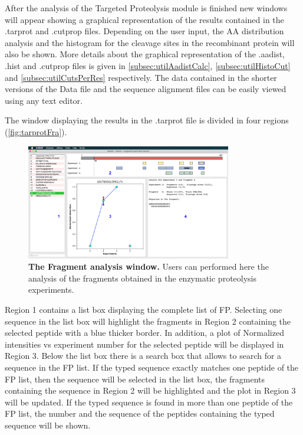 After the analysis of the Targeted Proteolysis module is finished new windows will appear showing a graphical representation of the results contained in the .tarprot and .cutprop files. Depending on the user input, the AA distribution analysis and the histogram for the cleavage sites in the recombinant protein will also be shown. More details about the graphical representation of the .aadist, .hist and .cutprop files is given in \autoref{subsec:utilAadistCalc}, \autoref{subsec:utilHistoCut} and \autoref{subsec:utilCutsPerRes} respectively. The data contained in the shorter versions of the Data file and the sequence alignment files can be easily viewed using any text editor.   

The window displaying the results in the .tarprot file is divided in four regions (\autoref{fig:tarprotFra}).

\begin{figure}[h]
    \centering
    \includegraphics[width=0.8\textwidth]{./IMAGES/MOD-TARPROT/tarprot-frag.jpg}	    
    \caption[The Fragment analysis window]{\textbf{The Fragment analysis window.} Users can performed here the analysis of the fragments obtained in the enzymatic proteolysis experiments.} 
    \label{fig:tarprotFra}
    \vspace{-5pt} 	
\end{figure} 

Region \num{1} contains a list box displaying the complete list of FP. Selecting one sequence in the list box will highlight the fragments in Region \num{2} containing the selected peptide with a blue thicker border. In addition, a plot of Normalized intensities vs experiment number for the selected peptide will be displayed in Region \num{3}. Below the list box there is a search box that allows to search for a sequence in the FP list. If the typed sequence exactly matches one peptide of the FP list, then the sequence will be selected in the list box, the fragments containing the sequence in Region \num{2} will be highlighted and the plot in Region \num{3} will be updated. If the typed sequence is found in more than one peptide of the FP list, the number and the sequence of the peptides containing the typed sequence will be shown.

